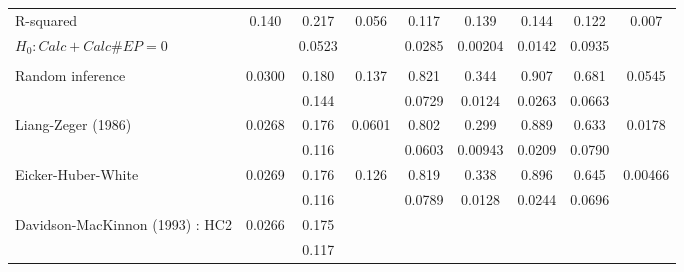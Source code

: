 \begin{tabular}{ccccccccc}
\multicolumn{1}{l}{R-squared} & 0.140 & 0.217 & 0.056 & 0.117 & 0.139 & 0.144 & 0.122 & 0.007 \\
\multicolumn{1}{l}{$H_0 : Calc + Calc\# EP = 0$} &       & 0.0523 &       & 0.0285 & 0.00204 & 0.0142 & 0.0935 &  \\
\midrule
\midrule
      &       &       &       &       &       &       &       &  \\
\midrule
\midrule
\multicolumn{1}{l}{\multirow{2}[2]{*}{Random inference}} & 0.0300 & 0.180 & 0.137 & 0.821 & 0.344 & 0.907 & 0.681 & 0.0545 \\
      & \cellcolor[rgb]{ .851,  .851,  .851} & \cellcolor[rgb]{ .851,  .851,  .851}0.144 & \cellcolor[rgb]{ .851,  .851,  .851} & \cellcolor[rgb]{ .851,  .851,  .851}0.0729 & \cellcolor[rgb]{ .851,  .851,  .851}0.0124 & \cellcolor[rgb]{ .851,  .851,  .851}0.0263 & \cellcolor[rgb]{ .851,  .851,  .851}0.0663 & \cellcolor[rgb]{ .851,  .851,  .851} \\
\midrule
\multicolumn{1}{l}{\multirow{2}[2]{*}{Liang-Zeger (1986)}} & 0.0268 & 0.176 & 0.0601 & 0.802 & 0.299 & 0.889 & 0.633 & 0.0178 \\
      & \cellcolor[rgb]{ .851,  .851,  .851} & \cellcolor[rgb]{ .851,  .851,  .851}0.116 & \cellcolor[rgb]{ .851,  .851,  .851} & \cellcolor[rgb]{ .851,  .851,  .851}0.0603 & \cellcolor[rgb]{ .851,  .851,  .851}0.00943 & \cellcolor[rgb]{ .851,  .851,  .851}0.0209 & \cellcolor[rgb]{ .851,  .851,  .851}0.0790 & \cellcolor[rgb]{ .851,  .851,  .851} \\
\midrule
\multicolumn{1}{l}{\multirow{2}[2]{*}{Eicker-Huber-White}} & 0.0269 & 0.176 & 0.126 & 0.819 & 0.338 & 0.896 & 0.645 & 0.00466 \\
      & \cellcolor[rgb]{ .851,  .851,  .851} & \cellcolor[rgb]{ .851,  .851,  .851}0.116 & \cellcolor[rgb]{ .851,  .851,  .851} & \cellcolor[rgb]{ .851,  .851,  .851}0.0789 & \cellcolor[rgb]{ .851,  .851,  .851}0.0128 & \cellcolor[rgb]{ .851,  .851,  .851}0.0244 & \cellcolor[rgb]{ .851,  .851,  .851}0.0696 & \cellcolor[rgb]{ .851,  .851,  .851} \\
\midrule
\multicolumn{1}{l}{\multirow{2}[2]{*}{Davidson-MacKinnon (1993) : HC2}} & 0.0266 & 0.175 &       &       &       &       &       &  \\
      & \cellcolor[rgb]{ .851,  .851,  .851} & \cellcolor[rgb]{ .851,  .851,  .851}0.117 & \cellcolor[rgb]{ .851,  .851,  .851} & \cellcolor[rgb]{ .851,  .851,  .851} & \cellcolor[rgb]{ .851,  .851,  .851} & \cellcolor[rgb]{ .851,  .851,  .851} & \cellcolor[rgb]{ .851,  .851,  .851} & \cellcolor[rgb]{ .851,  .851,  .851} \\

\end{tabular}

